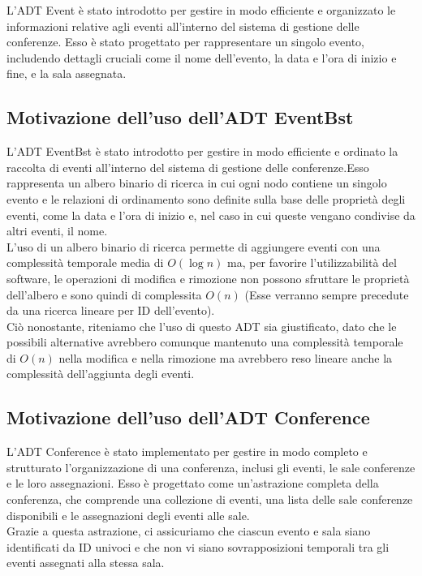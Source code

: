 \documentclass[11pt]{scrartcl} %
\begin{document}
L'ADT Event è stato introdotto per gestire in modo efficiente e organizzato le informazioni relative agli eventi all'interno del sistema di gestione delle conferenze. Esso è stato progettato per rappresentare un singolo evento, includendo dettagli cruciali come il nome dell'evento, la data e l'ora di inizio e fine, e la sala assegnata.

\subsection{Motivazione dell'uso dell'ADT EventBst}

L'ADT EventBst è stato introdotto per gestire in modo efficiente e ordinato la raccolta di eventi all'interno del sistema di gestione delle conferenze.Esso rappresenta un albero binario di ricerca in cui ogni nodo contiene un singolo evento e le relazioni di ordinamento sono definite sulla base delle proprietà degli eventi, come la data e l'ora di inizio e, nel caso in cui queste vengano condivise da altri eventi, il nome.\\
L'uso di un albero binario di ricerca permette di aggiungere eventi con una complessità temporale media di $O(\log{n})$ ma, per favorire l'utilizzabilità del software, le operazioni di modifica e rimozione non possono sfruttare le proprietà dell'albero e sono quindi di complessita $O(n)$ (Esse verranno sempre precedute da una ricerca lineare per ID dell'evento).\\
Ciò nonostante, riteniamo che l'uso di questo ADT sia giustificato, dato che le possibili alternative avrebbero comunque mantenuto una complessità temporale di $O(n)$ nella modifica e nella rimozione ma avrebbero reso lineare anche la complessità dell'aggiunta degli eventi.

\subsection{Motivazione dell'uso dell'ADT Conference}

L'ADT Conference è stato implementato per gestire in modo completo e strutturato l'organizzazione di una conferenza, inclusi gli eventi, le sale conferenze e le loro assegnazioni. Esso è progettato come un'astrazione completa della conferenza, che comprende una collezione di eventi, una lista delle sale conferenze disponibili e le assegnazioni degli eventi alle sale.\\
Grazie a questa astrazione, ci assicuriamo che ciascun evento e sala siano identificati da ID univoci e che non vi siano sovrapposizioni temporali tra gli eventi assegnati alla stessa sala.
\end{document}
